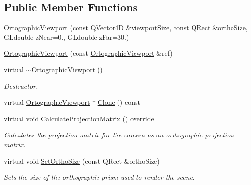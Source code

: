 \subsection*{Public Member Functions}
\begin{DoxyCompactItemize}
\item 
\mbox{\hyperlink{class_geometry_engine_1_1_geometry_item_utils_1_1_ortographic_viewport_ab209a520eb03901cc658da622914b5f7}{Ortographic\+Viewport}} (const Q\+Vector4D \&viewport\+Size, const Q\+Rect \&ortho\+Size, G\+Ldouble z\+Near=0., G\+Ldouble z\+Far=30.)
\item 
\mbox{\hyperlink{class_geometry_engine_1_1_geometry_item_utils_1_1_ortographic_viewport_a522e8770371fa1f12b0257e48773d201}{Ortographic\+Viewport}} (const \mbox{\hyperlink{class_geometry_engine_1_1_geometry_item_utils_1_1_ortographic_viewport}{Ortographic\+Viewport}} \&ref)
\item 
\mbox{\label{class_geometry_engine_1_1_geometry_item_utils_1_1_ortographic_viewport_a333fb2fed2e02506f8165b19a20169bd}} 
virtual \mbox{\hyperlink{class_geometry_engine_1_1_geometry_item_utils_1_1_ortographic_viewport_a333fb2fed2e02506f8165b19a20169bd}{$\sim$\+Ortographic\+Viewport}} ()
\begin{DoxyCompactList}\small\item\em Destructor. \end{DoxyCompactList}\item 
virtual \mbox{\hyperlink{class_geometry_engine_1_1_geometry_item_utils_1_1_ortographic_viewport}{Ortographic\+Viewport}} $\ast$ \mbox{\hyperlink{class_geometry_engine_1_1_geometry_item_utils_1_1_ortographic_viewport_a7729f7619d67c139f8510c305de1a286}{Clone}} () const
\item 
\mbox{\label{class_geometry_engine_1_1_geometry_item_utils_1_1_ortographic_viewport_a30dbefa19b28e26fd655255ccd5412b5}} 
virtual void \mbox{\hyperlink{class_geometry_engine_1_1_geometry_item_utils_1_1_ortographic_viewport_a30dbefa19b28e26fd655255ccd5412b5}{Calculate\+Projection\+Matrix}} () override
\begin{DoxyCompactList}\small\item\em Calculates the projection matrix for the camera as an orthographic projection matrix. \end{DoxyCompactList}\item 
\mbox{\label{class_geometry_engine_1_1_geometry_item_utils_1_1_ortographic_viewport_ada2137910c495f20108e98ae63ae55c8}} 
virtual void \mbox{\hyperlink{class_geometry_engine_1_1_geometry_item_utils_1_1_ortographic_viewport_ada2137910c495f20108e98ae63ae55c8}{Set\+Ortho\+Size}} (const Q\+Rect \&ortho\+Size)
\begin{DoxyCompactList}\small\item\em Sets the size of the orthographic prism used to render the scene. \end{DoxyCompactList}\end{DoxyCompactItemize}
